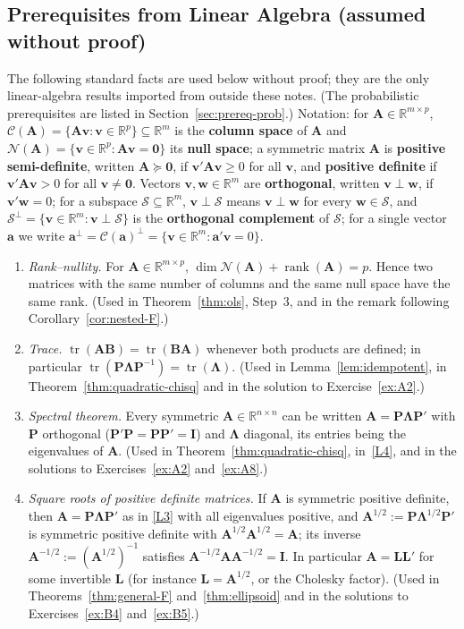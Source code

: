\documentclass[12pt,a4paper]{article}
\theoremstyle{definition}
\DeclareMathOperator\tr{tr}
\DeclareMathOperator\rank{rank}
\newcommand{\bI}{\mathbf{I}}
\newcommand{\bzero}{\mathbf{0}}
\newcommand{\bw}{\mathbf{w}}
\newcommand{\bA}{\mathbf{A}}
\newcommand{\bP}{\mathbf{P}}
\newcommand{\ba}{\mathbf{a}}
\newcommand{\bv}{\mathbf{v}}
\newcommand{\Real}{\mathbb{R}}
\newcommand{\calC}{\mathcal{C}}
\begin{document}
\subsection{Prerequisites from Linear Algebra (assumed without proof)}

The following standard facts are used below without proof; they are the only linear-algebra results imported from outside these notes. (The probabilistic prerequisites are listed in Section~\ref{sec:prereq-prob}.) Notation: for $\bA \in \Real^{m \times p}$, $\calC(\bA) = \{\bA\bv : \bv \in \Real^p\} \subseteq \Real^m$ is the \textbf{column space} of $\bA$ and $\mathcal{N}(\bA) = \{\bv \in \Real^p : \bA\bv = \bzero\}$ its \textbf{null space}; a symmetric matrix $\bA$ is \textbf{positive semi-definite}, written $\bA \succeq \bzero$, if $\bv'\bA\bv \geqslant 0$ for all $\bv$, and \textbf{positive definite} if $\bv'\bA\bv > 0$ for all $\bv \neq \bzero$. Vectors $\bv, \bw \in \Real^m$ are \textbf{orthogonal}, written $\bv \perp \bw$, if $\bv'\bw = 0$; for a subspace $\mathcal{S} \subseteq \Real^m$, $\bv \perp \mathcal{S}$ means $\bv \perp \bw$ for every $\bw \in \mathcal{S}$, and $\mathcal{S}^\perp = \{\bv \in \Real^m : \bv \perp \mathcal{S}\}$ is the \textbf{orthogonal complement} of $\mathcal{S}$; for a single vector $\ba$ we write $\ba^\perp = \calC(\ba)^\perp = \{\bv \in \Real^m : \ba'\bv = 0\}$.
\begin{enumerate}[label=\textup{(L\arabic*)}]
\item\label{L1} \emph{Rank--nullity.} For $\bA \in \Real^{m \times p}$, $\dim\mathcal{N}(\bA) + \rank(\bA) = p$. Hence two matrices with the same number of columns and the same null space have the same rank. (Used in Theorem~\ref{thm:ols}, Step~3, and in the remark following Corollary~\ref{cor:nested-F}.)
\item\label{L2} \emph{Trace.} $\tr(\bA\mathbf{B}) = \tr(\mathbf{B}\bA)$ whenever both products are defined; in particular $\tr(\bP\boldsymbol\Lambda\bP^{-1}) = \tr(\boldsymbol\Lambda)$. (Used in Lemma~\ref{lem:idempotent}, in Theorem~\ref{thm:quadratic-chisq} and in the solution to Exercise~\ref{ex:A2}.)
\item\label{L3} \emph{Spectral theorem.} Every symmetric $\bA \in \Real^{n \times n}$ can be written $\bA = \bP\boldsymbol\Lambda\bP'$ with $\bP$ orthogonal ($\bP'\bP = \bP\bP' = \bI$) and $\boldsymbol\Lambda$ diagonal, its entries being the eigenvalues of $\bA$. (Used in Theorem~\ref{thm:quadratic-chisq}, in~\ref{L4}, and in the solutions to Exercises~\ref{ex:A2} and~\ref{ex:A8}.)
\item\label{L4} \emph{Square roots of positive definite matrices.} If $\bA$ is symmetric positive definite, then $\bA = \bP\boldsymbol\Lambda\bP'$ as in \ref{L3} with all eigenvalues positive, and $\bA^{1/2} := \bP\boldsymbol\Lambda^{1/2}\bP'$ is symmetric positive definite with $\bA^{1/2}\bA^{1/2} = \bA$; its inverse $\bA^{-1/2} := (\bA^{1/2})^{-1}$ satisfies $\bA^{-1/2}\bA\bA^{-1/2} = \bI$. In particular $\bA = \mathbf{L}\mathbf{L}'$ for some invertible $\mathbf{L}$ (for instance $\mathbf{L} = \bA^{1/2}$, or the Cholesky factor). (Used in Theorems~\ref{thm:general-F} and~\ref{thm:ellipsoid} and in the solutions to Exercises~\ref{ex:B4} and~\ref{ex:B5}.)
\end{enumerate}
\end{document}
